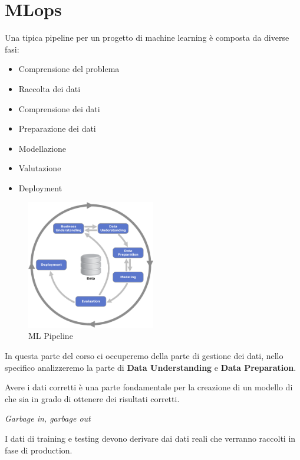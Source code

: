 \chapter{MLops}
Una tipica pipeline per un progetto di machine learning è composta da diverse fasi:
\begin{itemize}
      \item Comprensione del problema
      \item Raccolta dei dati
      \item Comprensione dei dati
      \item Preparazione dei dati
      \item Modellazione
      \item Valutazione
      \item Deployment
\end{itemize}
\begin{figure}[!ht]
      \centering
      \includegraphics[width=0.5\textwidth]{./img/MLops/CRISP-DM.png}
      \caption{ML Pipeline}
      \label{fig:ml_pipeline}
\end{figure}
In questa parte del corso ci occuperemo della parte di gestione dei dati, nello
specifico analizzeremo la parte di \textbf{Data Understanding} e \textbf{Data
      Preparation}.

Avere i dati corretti è una parte fondamentale per la creazione di un modello di
che sia in grado di ottenere dei risultati corretti.
\begin{center}
      \textit{Garbage in, garbage out}
\end{center}
I dati di training e testing devono derivare dai dati reali che verranno raccolti
in fase di production.
